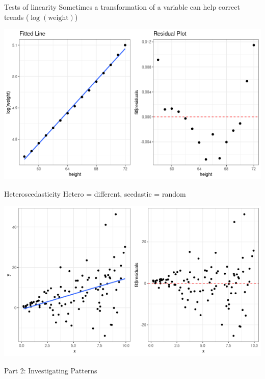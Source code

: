 \documentclass{beamer}
\begin{document}
\begin{frame}{Tests of linearity}
\small
Sometimes a transformation of a variable can help correct trends ($\log (\text{weight})$)
\begin{center}
\includegraphics[scale=0.5]{women_error_log.png}
\end{center}
\end{frame}

\begin{frame}{Heteroscedasticity}
\small
Hetero = different, scedastic = random
\begin{center}
\includegraphics[scale=0.5]{non_homog.png}
\end{center}
\end{frame}




\begin{frame}
\begin{center}
Part 2: Investigating Patterns
\end{center}
\end{frame}
\end{document}
